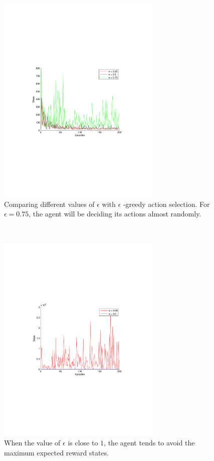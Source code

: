 \documentclass[a4paper,11pt]{article}
\begin{document}
\begin{figure}[t!]
  \centering
    \includegraphics[trim=4cm 8.5cm 4cm 8.5cm,clip,width=0.7\textwidth]{figures/egreedycomp.pdf}
    \caption{Comparing different values of $\epsilon$ with $\epsilon$ -greedy action selection. For $\epsilon = 0.75$, the agent will be deciding its actions almost randomly.}
    \label{egreedycomp}
\end{figure}
~
\begin{figure}[h!]
  \centering
    \includegraphics[trim=4cm 8.5cm 4cm 8.5cm,clip,width=0.7\textwidth]{figures/egreedyextreme.pdf}
    \caption{When the value of $\epsilon$ is close to $1$, the agent tends to avoid the maximum expected reward states.}
    \label{egreedyextreme}
\end{figure}
\end{document}
